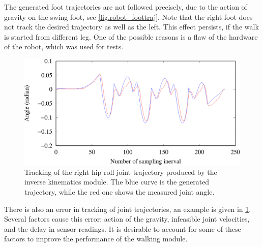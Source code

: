 The generated foot trajectories are not followed precisely, due to the action 
of gravity on the swing foot, see \cref{fig.robot_foottraj}. Note that
the right foot does not track the desired trajectory as well as the left.
This effect persists, if the walk is started from different leg. One of the
possible reasons is a flaw of the hardware of the robot, which was used for tests. 

\begin{figure}[ht]
    \centerline{%
    \includegraphics[scale=0.5]{Figures/hiproll.eps}}
    \caption[Joint trajectory tracking]{Tracking of the right hip roll joint trajectory
    produced by the inverse kinematics module. The blue curve is the generated trajectory,
    while the red one shows the measured joint angle.}
    \label{fig.hiproll}
\end{figure}

There is also an error in tracking of joint trajectories, an example is given in
\cref{fig.hiproll}. Several factors cause this error: action of the gravity, 
infeasible joint velocities, and the delay in sensor readings. It is desirable
to account for some of these factors to improve the performance of the walking
module.

